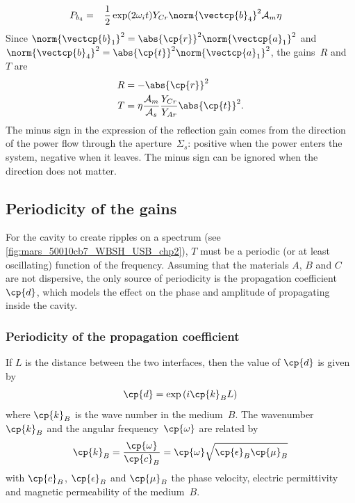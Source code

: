 \begin{refsection}
\begin{align}
    P_{b_4}
    &=
    \phantom{\mathrel{-}}
    \frac{1}{2}
    \exp(2\omega_i t)
    Y_{Cr}
    \norm{\vectcp{b}_4}^2
    \mathcal{A}_m
    \eta
\end{align}
Since $\norm{\vectcp{b}_1}^2 = \abs{\cp{r}}^2 \norm{\vectcp{a}_1}^2$
and   $\norm{\vectcp{b}_4}^2 = \abs{\cp{t}}^2 \norm{\vectcp{a}_1}^2$,
the gains~$R$ and~$T$ are
\begin{align}
    R
    &=
    -\abs{\cp{r}}^2
    \label{eq:fabry_gain_r}
    \\%
    T
    &=
    \eta
    \frac{\mathcal{A}_m}{\mathcal{A}_s}
    \frac{Y_{Cr}}{Y_{Ar}}
    \abs{\cp{t}}^2
    \text{.}
    \label{eq:fabry_gain_t}
\end{align}
The minus sign in the expression of the reflection gain comes from the direction of the power flow through the aperture~$\Sigma_s$: positive when the power enters the system, negative when it leaves.
The minus sign can be ignored when the direction does not matter.






\subsection{Periodicity of the gains}
\label{sec:periodicity_in_power}

For the cavity to create ripples on a spectrum (see \vref{fig:mars_50010cb7_WBSH_USB_chp2}), $T$ must be a periodic (or at least oscillating) function of the frequency.
Assuming that the materials $A$, $B$ and $C$ are not dispersive, the only source of periodicity is the propagation coefficient $\cp{d}$, which models the effect on the phase and amplitude of propagating inside the cavity.



\subsubsection{Periodicity of the propagation coefficient}

If $L$ is the distance between the two interfaces, then the value of $\cp{d}$ is given by
\begin{equation}
    \cp{d} = \exp \left( i\cp{k}_B L \right) \label{eq:cavity_s_k}
\end{equation}
where $\cp{k}_B$ is the wave number in the medium~$B$.
The wavenumber~$\cp{k}_B$ and the angular frequency~$\cp{\omega}$ are related by
\begin{equation}
    \cp{k}_B
    =
    \frac{\cp{\omega}}{\cp{c}_B}
    =
    \cp{\omega} \sqrt{\cp{\epsilon}_B \cp{\mu}_B}
\end{equation}
with $\cp{c}_B$, $\cp{\epsilon}_B$ and $\cp{\mu}_B$ the phase velocity, electric permittivity and magnetic permeability of the medium~$B$.


\end{refsection}
